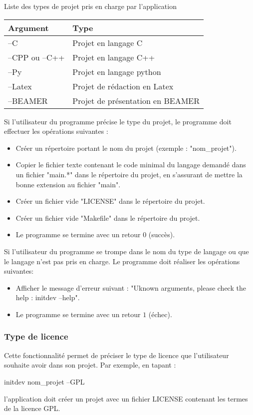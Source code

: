 \documentclass[10pt,a4paper]{article}
\begin{document}
  Liste des types de projet pris en charge par l'application
  \begin{center}
  \begin{tabular}{l|l}
    Argument & Type \\ \hline
    --C & Projet en langage C \\
    --CPP ou --C++ & Projet en langage C++ \\
    --Py & Projet en langage python  \\
    --Latex & Projet de rédaction en Latex \\
    --BEAMER & Projet de présentation en BEAMER \\
  \end{tabular}
\end{center}

Si l'utilisateur du programme précise le type du projet, le programme doit effectuer les opérations suivantes :
  \begin{itemize}
    \item Créer un répertoire portant le nom du projet (exemple : "nom\_projet").
    \item Copier le fichier texte contenant le code minimal du langage demandé dans un fichier "main.*" dans le répertoire du projet, en s'assurant de mettre la bonne extension au fichier "main".
    \item Créer un fichier vide "LICENSE" dans le répertoire du projet.
    \item Créer un fichier vide "Makefile" dans le répertoire du projet.
    \item Le programme se termine avec un retour $0$ (succès).
  \end{itemize}

  Si l'utilisateur du programme se trompe dans le nom du type de langage ou que le langage n'est pas pris en charge. Le programme doit réaliser les opérations suivantes:
  \begin{itemize}
    \item Afficher le message d'erreur suivant : "Uknown arguments, please check the help : initdev --help".
    \item Le programme se termine avec un retour $1$ (échec). 
\end{itemize}


\subsubsection{Type de licence}
  Cette fonctionnalité permet de préciser le type de licence que l'utilisateur souhaite avoir dans son projet. Par exemple, en tapant :
  \begin{center}
    initdev nom\_projet --GPL
  \end{center}
  l'application doit créer un projet avec un fichier LICENSE contenant les termes de la licence GPL.
\end{document}
